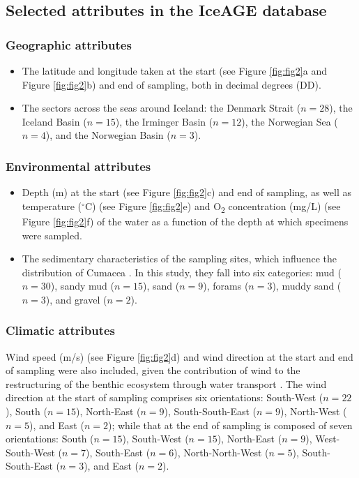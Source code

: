 \subsection{Selected attributes in the IceAGE database}

\subsubsection{Geographic attributes} 

\begin{itemize}
\item The latitude and longitude taken at the start (see Figure \ref{fig:fig2}a and Figure \ref{fig:fig2}b) and end of sampling, both in decimal degrees (DD).
\item The sectors across the seas around Iceland: the Denmark Strait ($n=28$), the Iceland Basin ($n=15$), the Irminger Basin ($n=12$), the Norwegian Sea ($n=4$), and the Norwegian Basin ($n=3$). 
\end{itemize}

\subsubsection{Environmental attributes} 
\begin{itemize}
\item Depth (m) at the start (see Figure \ref{fig:fig2}c) and end of sampling, as well as temperature ($^\circ$C) (see Figure \ref{fig:fig2}e) and O\textsubscript{2} concentration (mg/L) (see Figure \ref{fig:fig2}f) of the water as a function of the depth at which specimens were sampled. 
\item The sedimentary characteristics of the sampling sites, which influence the distribution of Cumacea \citep{uhlir_adding_2021}. In this study, they fall into six categories: mud ($n=30$), sandy mud ($n=15$), sand ($n=9$), forams ($n=3$), muddy sand ($n=3$), and gravel ($n=2$).
\end{itemize}

\subsubsection{Climatic attributes} 
Wind speed (m/s) (see Figure \ref{fig:fig2}d) and wind direction at the start and end of sampling were also included, given the contribution of wind to the restructuring of the benthic ecosystem through water transport \citep{waga_recent_2020,saeedi_environmental_2022}. The wind direction at the start of sampling comprises six orientations: South-West ($n=22$), South ($n=15$), North-East ($n=9$), South-South-East ($n=9$), North-West ($n=5$), and East ($n=2$); while that at the end of sampling is composed of seven orientations: South ($n=15$), South-West ($n=15$), North-East ($n=9$), West-South-West ($n=7$), South-East ($n=6$), North-North-West ($n=5$), South-South-East ($n=3$), and East ($n=2$). 

